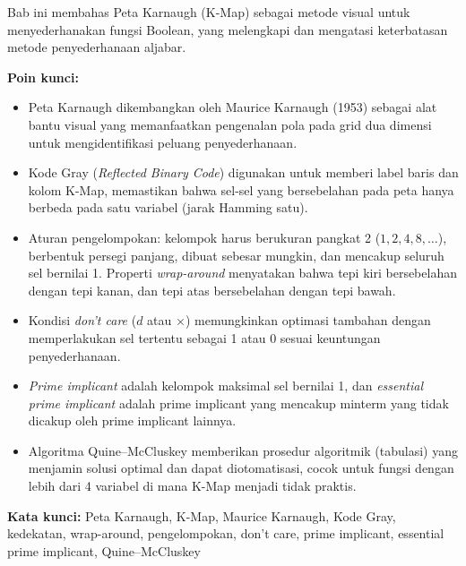 \documentclass[../main]{subfiles}
\begin{document}

\begin{rangkuman}
Bab ini membahas Peta Karnaugh (K-Map) sebagai metode visual untuk menyederhanakan fungsi Boolean, yang melengkapi dan mengatasi keterbatasan metode penyederhanaan aljabar.

\textbf{Poin kunci:}
\begin{itemize}
  \item Peta Karnaugh dikembangkan oleh Maurice Karnaugh (1953) sebagai alat bantu visual yang memanfaatkan pengenalan pola pada grid dua dimensi untuk mengidentifikasi peluang penyederhanaan.
  \item Kode Gray (\textit{Reflected Binary Code}) digunakan untuk memberi label baris dan kolom K-Map, memastikan bahwa sel-sel yang bersebelahan pada peta hanya berbeda pada satu variabel (jarak Hamming satu).
  \item Aturan pengelompokan: kelompok harus berukuran pangkat 2 ($1, 2, 4, 8, \ldots$), berbentuk persegi panjang, dibuat sebesar mungkin, dan mencakup seluruh sel bernilai 1. Properti \textit{wrap-around} menyatakan bahwa tepi kiri bersebelahan dengan tepi kanan, dan tepi atas bersebelahan dengan tepi bawah.
  \item Kondisi \textit{don't care} ($d$ atau $\times$) memungkinkan optimasi tambahan dengan memperlakukan sel tertentu sebagai 1 atau 0 sesuai keuntungan penyederhanaan.
  \item \textit{Prime implicant} adalah kelompok maksimal sel bernilai 1, dan \textit{essential prime implicant} adalah prime implicant yang mencakup minterm yang tidak dicakup oleh prime implicant lainnya.
  \item Algoritma Quine--McCluskey memberikan prosedur algoritmik (tabulasi) yang menjamin solusi optimal dan dapat diotomatisasi, cocok untuk fungsi dengan lebih dari 4 variabel di mana K-Map menjadi tidak praktis.
\end{itemize}

\textbf{Kata kunci:} Peta Karnaugh, K-Map, Maurice Karnaugh, Kode Gray, kedekatan, wrap-around, pengelompokan, don't care, prime implicant, essential prime implicant, Quine--McCluskey
\end{rangkuman}

\ifSubfilesClassLoaded{
  \renewcommand{\bibname}{Daftar Pustaka}
  
  
}{}
\end{document}
